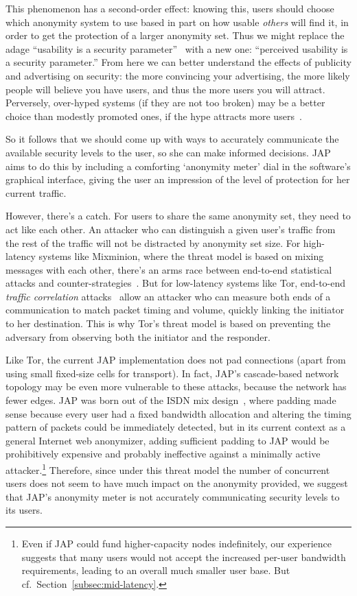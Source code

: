 \documentclass{llncs}
\begin{document}
This phenomenon has a second-order effect: knowing this, users should
choose which anonymity system to use based in part on how usable
\emph{others} will find it, in order to get the protection of a larger
anonymity set. Thus we might replace the adage ``usability is a security
parameter''~\cite{back01} with a new one: ``perceived usability is a
security parameter.'' From here we can better understand the effects
of publicity and advertising on security: the more convincing your
advertising, the more likely people will believe you have users, and thus
the more users you will attract. Perversely, over-hyped systems (if they
are not too broken) may be a better choice than modestly promoted ones,
if the hype attracts more users~\cite{usability-network-effect}.

So it follows that we should come up with ways to accurately communicate
the available security levels to the user, so she can make informed
decisions. JAP aims to do this by including a
comforting `anonymity meter' dial in the software's graphical interface,
giving the user an impression of the level of protection for her current
traffic.

However, there's a catch. For users to share the same anonymity set,
they need to act like each other. An attacker who can distinguish
a given user's traffic from the rest of the traffic will not be
distracted by anonymity set size. For high-latency systems like
Mixminion, where the threat model is based on mixing messages with each
other, there's an arms race between end-to-end statistical attacks and
counter-strategies~\cite{statistical-disclosure,minion-design,e2e-traffic,trickle02}.
But for low-latency systems like Tor, end-to-end \emph{traffic
correlation} attacks~\cite{danezis-pet2004,defensive-dropping,SS03}
allow an attacker who can measure both ends of a communication
to match packet timing and volume, quickly linking
the initiator to her destination. This is why Tor's threat model is
based on preventing the adversary from observing both the initiator and
the responder.

Like Tor, the current JAP implementation does not pad connections
(apart from using small fixed-size cells for transport). In fact,
JAP's cascade-based network topology may be even more vulnerable to these
attacks, because the network has fewer edges. JAP was born out of
the ISDN mix design~\cite{isdn-mixes}, where padding made sense because
every user had a fixed bandwidth allocation and altering the timing
pattern of packets could be immediately detected, but in its current context
as a general Internet web anonymizer, adding sufficient padding to JAP
would be prohibitively expensive and probably ineffective against a
minimally active attacker.\footnote{Even if JAP could
fund higher-capacity nodes indefinitely, our experience
suggests that many users would not accept the increased per-user
bandwidth requirements, leading to an overall much smaller user base. But
cf.\ Section~\ref{subsec:mid-latency}.} Therefore, since under this threat
model the number of concurrent users does not seem to have much impact
on the anonymity provided, we suggest that JAP's anonymity meter is not
accurately communicating security levels to its users.
\end{document}
